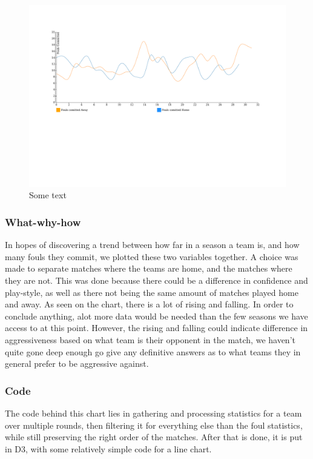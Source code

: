 \documentclass[Report.tex]{subfiles}
\begin{document}
\begin{figure}
\center
\includegraphics[width=\textwidth, trim = 0 220 0 0, clip]{Figures/fouls.pdf}
\caption{Some text}
\label{Fig:}
\end{figure}


\subsubsection{What-why-how}
In hopes of discovering a trend between how far in a season a team is, and how many fouls they commit, we plotted these two variables together. A choice was made to separate matches where the teams are home, and the matches where they are not. This was done because there could be a difference in confidence and play-style, as well as there not being the same amount of matches played home and away.
 As seen on the chart, there is a lot of rising and falling. In order to conclude anything, alot more data would be needed than the few seasons we have access to at this point. However, the rising and falling could indicate difference in aggressiveness based on what team is their opponent in the match, we haven't quite gone deep enough go give any definitive answers as to what teams they in general prefer to be aggressive against.

\subsubsection{Code}
The code behind this chart lies in gathering and processing statistics for a team over multiple rounds, then filtering it for everything else than the foul statistics, while still preserving the right order of the matches. After that is done, it is put in D3, with some relatively simple code for a line chart.
\end{document}

